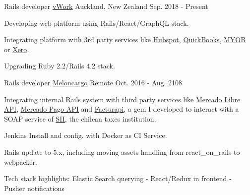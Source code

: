 
\begin{cventries}

  \cventry
    {Rails developer} %
    {\href{http://www.vworkapp.com/}{\underline{vWork}}} %
    {Auckland, New Zealand} %
    {Sep. 2018 - Present} %
    {
      \begin{cvitems} %
        \item { Developing web platform using Rails/React/GraphQL stack. }
        \item { Integrating platform with 3rd party services like
                \href{https://www.hubspot.com/}{\underline{Hubspot}},
                \href{https://quickbooks.intuit.com/}{\underline{QuickBooks}},
                \href{https://www.myob.com}{\underline{MYOB}} or
                \href{https://www.xero.com}{\underline{Xero}}. }
        \item { Upgrading Ruby 2.2/Rails 4.2 stack. }
      \end{cvitems}
    }

  \cventry
    {Rails developer} %
    {\href{http://www.meloncargo.com/}{\underline{Meloncargo}}} %
    {Remote} %
    {Oct. 2016 - Aug. 2108} %
    {
      \begin{cvitems} %
        \item { Integrating internal Rails system with third party services like
                \href{http://developers.mercadolibre.com/}{\underline{Mercado Libre API}},
                \href{https://www.mercadopago.com.br/developers/es/api-docs/}{\underline{Mercado Pago API}}
                and \href{https://github.com/alagos/facturapi}{\underline{Facturapi}},
                a gem I developed to interact with a SOAP service of \href{http://www.sii.cl}{\underline{SII}},
                the chilean taxes institution. }
        \item { Jenkins Install and config. with Docker as CI Service. }
        \item { Rails update to 5.x, including moving assets handling from react\_on\_rails to webpacker. }
        \item { Tech stack highlights: Elastic Search querying - React/Redux in frontend - Pusher notifications }
      \end{cvitems}
    }


\end{cventries}
